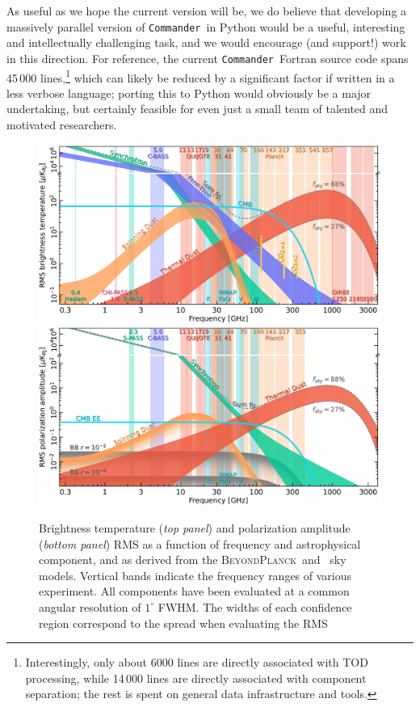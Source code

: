 \documentclass[onecolumn]{aa}
\def\commander{\texttt{Commander}}
\newcommand{\BP}{\textsc{BeyondPlanck}}
\begin{document}
As useful as we hope the current version will be, we do believe that
developing a massively parallel version of \commander\ in Python would
be a useful, interesting and intellectually challenging task, and we
would encourage (and support!) work in this direction. For reference,
the current \commander\ Fortran source code spans 45\,000
lines,\footnote{Interestingly, only about 6000 lines are directly
  associated with TOD processing, while 14\,000 lines are directly
  associated with component separation; the rest is spent on general
  data infrastructure and tools.} which can likely be reduced by a
significant factor if written in a less verbose language; porting this
to Python would obviously be a major undertaking, but certainly
feasible for even just a small team of talented and motivated
researchers.

\begin{figure}[t]
  \center
  \includegraphics[width=0.8\linewidth]{figs/spectrum_long.pdf}
  \includegraphics[width=0.8\linewidth]{figs/spectrum_pol_long.pdf}
  \caption{Brightness temperature (\emph{top panel}) and polarization
    amplitude (\emph{bottom panel}) RMS as a function of frequency and
    astrophysical component, and as derived from the \BP\ and
    \Planck\ sky models. Vertical bands indicate the frequency ranges
    of various experiment. All components have been evaluated at a
    common angular resolution of $1^{\circ}$ FWHM. The widths of each
    confidence region correspond to the spread when evaluating the RMS
}
\end{figure}
\end{document}
